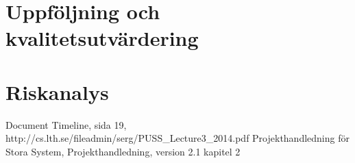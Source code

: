 ﻿\documentclass[a4paper]{article}
\begin{document}
\section{Uppföljning och kvalitetsutvärdering}
\begin{comment} 
Det ska finnas en del i projektplanen som beskriver hur uppföljning, tex av tidsplanen, sker under projektet, samt vad som händer om arbetet inte verkar gå enligt plan. Det ska också finnas en beskrivning av de rutiner som finns för kvalitetsutvärdering under projektet.

\end{comment}

\section{Riskanalys}
\begin{comment}
I projektplanen ska även resultatet av en riskanalys för projektet presenteras. Ange hur riskanalys utförts i projektet, samt de viktigaste riskerna som identifierats. Rapportera åtminstone följande för varje rapporterad risk: skattad sannolikhet (tex låg, medel, hög), skattad effekt (tex låg, medel, hög), möjliga indikationer på att risken förverkligas, samt exempel på lösningar om risken förverkligas.

\end{comment}
\newpage

\begin{thebibliography}{1}
 Document Timeline, sida 19, http://cs.lth.se/fileadmin/serg/PUSS\_Lecture3\_2014.pdf 
 Projekthandledning för Stora System, Projekthandledning, version 2.1 kapitel 2
\end{thebibliography}
\end{document}
